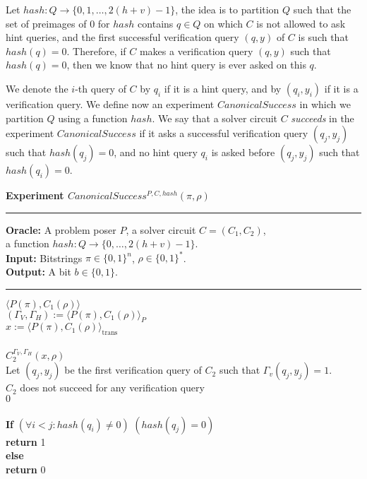 %

Let $hash:Q\rightarrow\{0,1,\dots, 2(h+v)-1\}$,
the idea is to partition $Q$ such that the set of preimages of $0$ for $hash$ contains $q \in Q$ on which $C$ is not allowed to ask hint queries,
and the first successful verification query $(q,y)$ of $C$ is such that $hash(q) = 0$.
Therefore, if $C$ makes a verification query $(q,y)$ such that $hash(q) = 0$, then we know that no hint query is ever asked on this $q$.

We denote the $i$-th query of $C$ by $q_i$ if it is a hint query, and by $(q_i, y_i)$ if it is a verification query.
We define now an experiment $CanonicalSuccess$ in which we partition $Q$ using a function $hash$.
We say that a solver circuit $C$ \textit{succeeds} in the experiment $CanonicalSuccess$
if it asks a successful verification query $(q_j, y_j)$ such that $hash(q_j) = 0$,
and no hint query $q_i$ is asked before $(q_j, y_j)$ such that $hash(q_i) = 0$.
%
\begin{codeblock}
  \textbf{Experiment $CanonicalSuccess^{P, C, hash}(\pi, \rho)$}
  \medskip
  \hrule
  \medskip
  \textbf{Oracle:} A problem poser $P$, a solver circuit $C = (C_1, C_2)$,\\
  \IndII a function $hash: Q \rightarrow \{0, \dots, 2(h+v) - 1\}$.\\
  \textbf{Input:}  Bitstrings $\pi \in \{0,1\}^n$, $\rho \in \{0,1\}^*$. \\
  \textbf{Output:} A bit $b \in \{0,1\}$.

  \medskip\hrule\medskip
  \Run $\langle P(\pi), C_1(\rho) \rangle$ \\
  \IndI $(\Gamma_V, \Gamma_H) := \langle P(\pi), C_1(\rho) \rangle_{P}$ \\
  \IndI $x := \langle P(\pi), C_1(\rho) \rangle_{\text{trans}}$ \\ \\
  \Run $C_2^{\Gamma_V, \Gamma_H} (x, \rho)$ \\
  \IndI Let $(q_j,y_j)$ be the first verification query of $C_2$ such that $\Gamma_v(q_j, y_j) = 1$.\\
  \IndI \If $C_2$ does not succeed for any verification query \Then \\
  \IndII \Return $0$ \\
  \\
  \textbf{If} $(\forall i < j :  hash(q_i) \neq 0)$ \And $(hash(q_j) = 0)$ \Then \\
  \IndI \textbf{return} 1\\
  \textbf{else}\\
  \IndI \textbf{return} 0
\end{codeblock}
